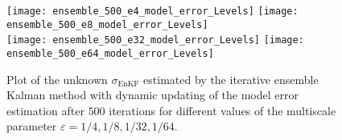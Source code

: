 \begin{figure}[t]
\centering
\texttt{[image: ensemble\_500\_e4\_model\_error\_Levels]}
\texttt{[image: ensemble\_500\_e8\_model\_error\_Levels]}
\\
\texttt{[image: ensemble\_500\_e32\_model\_error\_Levels]}
\texttt{[image: ensemble\_500\_e64\_model\_error\_Levels]}
\caption{Plot of the unknown $\sigma_{\mathrm{EnKF}}$ estimated by the iterative ensemble Kalman method with dynamic updating of the model error estimation after $500$ iterations for different values of the multiscale parameter $\varepsilon = 1/4, 1/8, 1/32, 1/64$.}
\label{fig:comparison_e_model_error_levels}
\end{figure}

\clearpage

